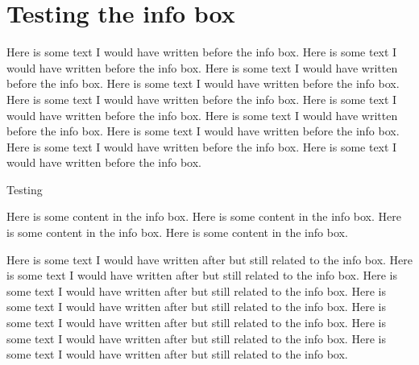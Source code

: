 \documentclass[12pt]{scrbook}
\begin{document}
\chapter{Testing the info box}

Here is some text I would have written before the info box. Here is some text I would have written before the info box. Here is some text I would have written before the info box. Here is some text I would have written before the info box. Here is some text I would have written before the info box. Here is some text I would have written before the info box. Here is some text I would have written before the info box. Here is some text I would have written before the info box. Here is some text I would have written before the info box. Here is some text I would have written before the info box.

\begin{infobox}[!htb]
\caption{Testing}
	Here is some content in the info box. Here is some content in the info box. Here is some content in the info box. Here is some content in the info box. 
\end{infobox}

Here is some text I would have written after but still related to the info box. Here is some text I would have written after but still related to the info box. Here is some text I would have written after but still related to the info box. Here is some text I would have written after but still related to the info box. Here is some text I would have written after but still related to the info box. Here is some text I would have written after but still related to the info box. Here is some text I would have written after but still related to the info box.
\end{document}
